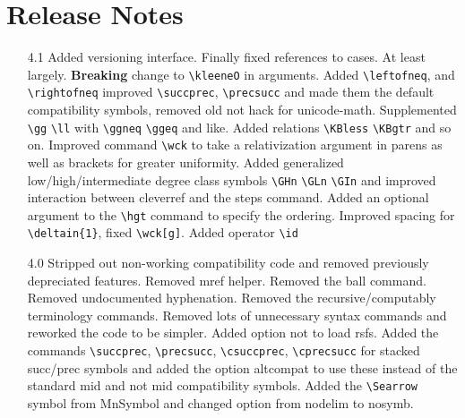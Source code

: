 \documentclass[leqno,11pt]{amsart}
\begin{document}
\section{Release Notes}


\begin{itemize}
	\item[4.1] Added versioning interface.  Finally fixed references to cases.  At least largely.  \textbf{Breaking} change to \verb=\kleeneO= in arguments.  Added \verb=\leftofneq=, and \verb=\rightofneq= improved \verb=\succprec=, \verb=\precsucc= and made them the default compatibility symbols, removed old not hack for unicode-math.  Supplemented \verb=\gg= \verb=\ll= with \verb=\ggneq= \verb=\ggeq= and like.  Added relations \verb=\KBless= \verb=\KBgtr= and so on.  Improved command \verb=\wck= to take a relativization argument in parens as well as brackets for greater uniformity.  Added generalized low/high/intermediate degree class symbols \verb=\GHn= \verb=\GLn= \verb=\GIn= and improved interaction between cleverref and the steps command.  Added an optional argument to the \verb=\hgt= command to specify the ordering.  Improved spacing for \verb=\deltain{1}=, fixed \verb=\wck[g]=.  Added operator \verb=\id=
	\item[4.0] Stripped out non-working compatibility code and removed previously depreciated features.  Removed mref helper.  Removed the ball command.  Removed undocumented hyphenation.  Removed the recursive/computably terminology commands.   Removed lots of unnecessary syntax commands and reworked the code to be simpler.  Added option not to load rsfs.  Added the commands \verb=\succprec=, \verb=\precsucc=, \verb=\csuccprec=, \verb=\cprecsucc= for stacked succ/prec symbols and added the option altcompat to use these instead of the standard mid and not mid compatibility symbols.  Added the \verb=\Searrow= symbol from MnSymbol and changed option from nodelim to nosymb.

\end{itemize}
\end{document}
